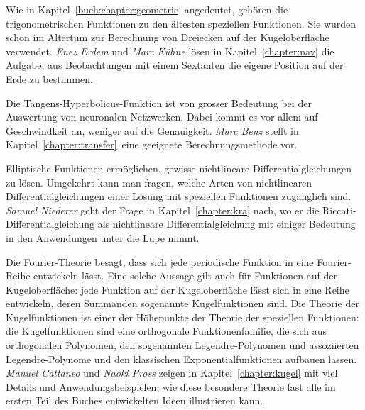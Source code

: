 Wie in Kapitel~\ref{buch:chapter:geometrie} angedeutet, gehören die
trigonometrischen Funktionen zu den ältesten speziellen Funktionen.
Sie wurden schon im Altertum zur Berechnung von Dreiecken auf der
Kugeloberfläche verwendet.
{\em Enez Erdem}
%
%
und 
{\em Marc Kühne}
%
%
lösen in Kapitel~\ref{chapter:nav} die Aufgabe, aus Beobachtungen
mit einem Sextanten die eigene Position auf der Erde zu bestimmen.

Die Tangens-Hyperbolicus-Funktion ist von grosser Bedeutung bei
der Auswertung von neuronalen Netzwerken.
Dabei kommt es vor allem auf Geschwindkeit an, weniger auf die
Genauigkeit.
{\em Marc Benz}
%
%
stellt in Kapitel~\ref{chapter:transfer} eine geeignete
Berechnungsmethode vor.

Elliptische Funktionen ermöglichen, gewisse nichtlineare
Differentialgleichungen zu lösen.
Umgekehrt kann man fragen, welche Arten von nichtlinearen
Differentialgleichungen einer Lösung mit speziellen Funktionen
zugänglich sind.
{\em Samuel Niederer} geht der Frage in Kapitel~\ref{chapter:kra} 
%
%
nach, wo er die Riccati-Differentialgleichung als nichtlineare
Differentialgleichung mit einiger Bedeutung in den Anwendungen
unter die Lupe nimmt.

Die Fourier-Theorie besagt, dass sich jede periodische Funktion in eine
Fourier-Reihe entwickeln lässt.
Eine solche Aussage gilt auch für Funktionen auf der Kugeloberfläche: 
jede Funktion auf der Kugeloberfläche lässt sich in eine Reihe
entwickeln, deren Summanden sogenannte Kugelfunktionen sind.
Die Theorie der Kugelfunktionen ist einer der Höhepunkte der Theorie
der speziellen Funktionen: die Kugelfunktionen sind eine orthogonale
Funktionenfamilie, die sich aus orthogonalen Polynomen, den sogenannten
Legendre-Polynomen und assoziierten Legendre-Polynome und den
klassischen Exponentialfunktionen aufbauen lassen.
{\em Manuel Cattaneo}
%
%
und
{\em Naoki Pross}
%
%
zeigen in Kapitel~\ref{chapter:kugel} mit viel Details und
Anwendungsbeispielen, wie diese besondere Theorie fast alle im ersten
Teil des Buches entwickelten Ideen illustrieren kann.

